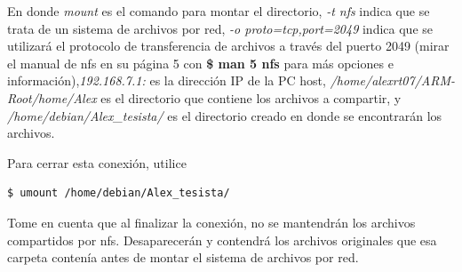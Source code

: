 En donde \textit{mount} es el comando para montar el directorio, \textit{-t nfs} indica que se trata de un sistema de archivos por red, \textit{-o proto=tcp,port=2049} indica que se utilizará el protocolo de transferencia de archivos a través del puerto 2049 (mirar el manual de nfs en su página 5 con \textbf{\$ man 5 nfs} para más opciones e información),\textit{192.168.7.1:} es la dirección IP de la PC host, \textit{/home/alexrt07/ARM-Root/home/Alex} es el directorio que contiene los archivos a compartir, y \textit{/home/debian/Alex\_tesista/} es el directorio creado en donde se encontrarán los archivos.

Para cerrar esta conexión, utilice

\begin{lstlisting}[language=bash]
$ umount /home/debian/Alex_tesista/
\end{lstlisting}

Tome en cuenta que al finalizar la conexión, no se mantendrán los archivos compartidos por nfs. Desaparecerán y contendrá los archivos originales que esa carpeta contenía antes de montar el sistema de archivos por red.

%